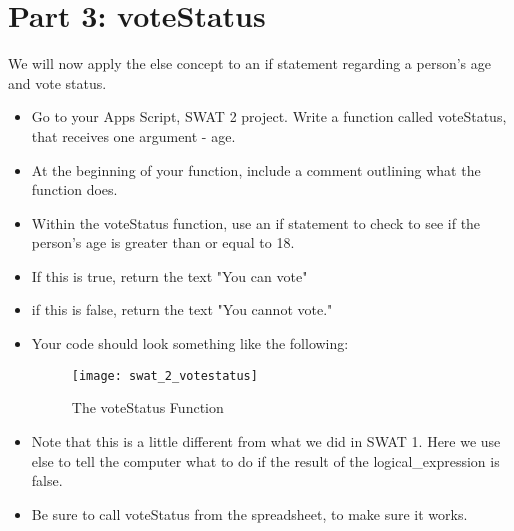 \documentclass{article}
\begin{document}
\section*{Part 3: voteStatus}
We will now apply the else concept to an if statement regarding a person's age and vote status.  
\begin{itemize}
	\item Go to your Apps Script, SWAT 2 project.  Write a function called voteStatus, that receives one argument - age.
    	\item At the beginning of your function, include a comment outlining what the function does.
	\item Within the voteStatus function, use an if statement to check to see if the person's age is greater than or equal to 18.  
	\item If this is true, return the text "You can vote"
	\item if this is false, return the text "You cannot vote."
	\item Your code should look something like the following:
	\begin{figure}[H]
  		\centering
  		\texttt{[image: swat\_2\_votestatus]}
  		\caption{The voteStatus Function}
	\end{figure}
	\item Note that this is a little different from what we did in SWAT 1.  Here we use else to tell the computer what to do if the result of the logical\_expression is false.
	\item Be sure to call voteStatus from the spreadsheet, to make sure it works.
\end{itemize}
\end{document}
